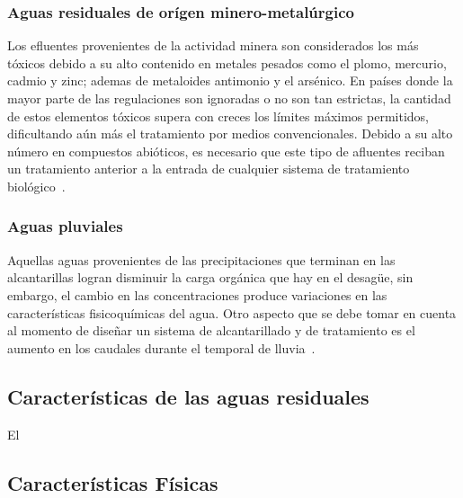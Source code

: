 \subsubsection{Aguas residuales de orígen minero-metalúrgico}
Los efluentes provenientes de la actividad minera son considerados los más tóxicos debido a su alto contenido en metales pesados como el plomo, mercurio, cadmio y zinc; ademas de metaloides antimonio y el arsénico. En países donde la mayor parte de las regulaciones son ignoradas o no son tan estrictas, la cantidad de estos elementos tóxicos supera con creces los límites máximos permitidos, dificultando aún más el tratamiento por medios convencionales. Debido a su alto número en compuestos abióticos, es necesario que este tipo de afluentes reciban un tratamiento anterior a la entrada de cualquier sistema de tratamiento biológico~\citep{lazcano2016}.
\subsubsection{Aguas pluviales}
Aquellas aguas provenientes de las precipitaciones que terminan en las alcantarillas logran disminuir la carga orgánica que hay en el desagüe, sin embargo, el cambio en las concentraciones produce variaciones en las características fisicoquímicas del agua. Otro aspecto que se debe tomar en cuenta al momento de diseñar un sistema de alcantarillado y de tratamiento es el aumento en los caudales durante el temporal de lluvia~\citep{lazcano2016}.
\subsection{Características de las aguas residuales}
El 
\subsection{Características Físicas}
